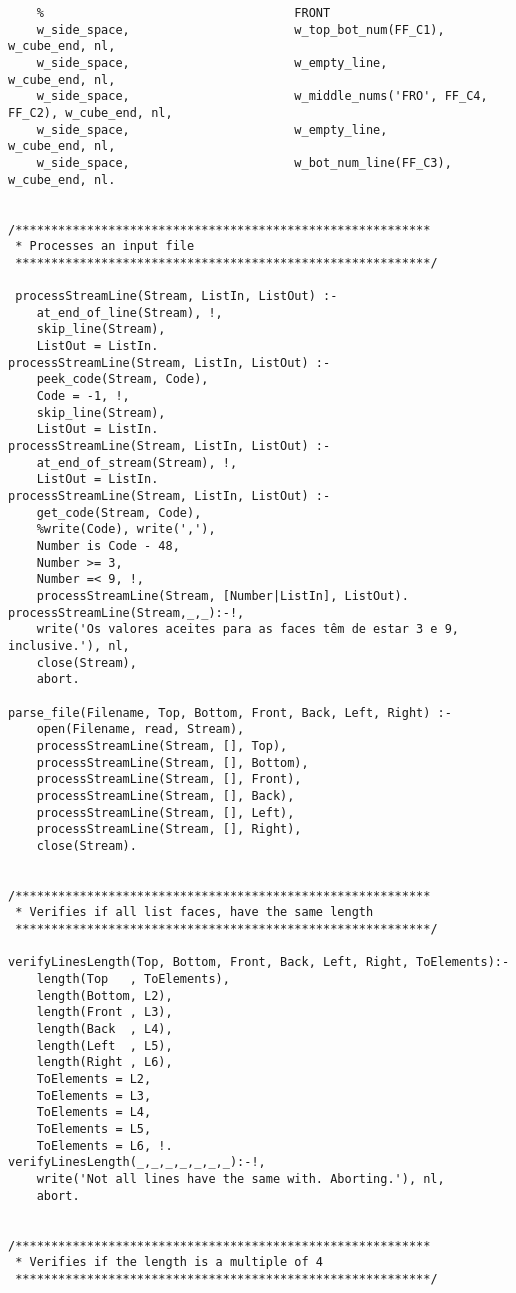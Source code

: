 \begin{lstlisting}
	%                                   FRONT
	w_side_space,                       w_top_bot_num(FF_C1),               w_cube_end, nl,
	w_side_space,                       w_empty_line,                       w_cube_end, nl,
	w_side_space,                       w_middle_nums('FRO', FF_C4, FF_C2), w_cube_end, nl,
	w_side_space,                       w_empty_line,                       w_cube_end, nl,
	w_side_space,                       w_bot_num_line(FF_C3),              w_cube_end, nl.
	

/**********************************************************
 * Processes an input file
 **********************************************************/

 processStreamLine(Stream, ListIn, ListOut) :-
	at_end_of_line(Stream), !,
	skip_line(Stream),
	ListOut = ListIn.
processStreamLine(Stream, ListIn, ListOut) :-
	peek_code(Stream, Code),
	Code = -1, !,
	skip_line(Stream),
	ListOut = ListIn. 
processStreamLine(Stream, ListIn, ListOut) :-
	at_end_of_stream(Stream), !,
	ListOut = ListIn.
processStreamLine(Stream, ListIn, ListOut) :-
	get_code(Stream, Code),
	%write(Code), write(','),
	Number is Code - 48,
	Number >= 3,
	Number =< 9, !,
	processStreamLine(Stream, [Number|ListIn], ListOut).
processStreamLine(Stream,_,_):-!,
	write('Os valores aceites para as faces têm de estar 3 e 9, inclusive.'), nl,
	close(Stream),
	abort.
	
parse_file(Filename, Top, Bottom, Front, Back, Left, Right) :-
	open(Filename, read, Stream),
	processStreamLine(Stream, [], Top),
	processStreamLine(Stream, [], Bottom),
	processStreamLine(Stream, [], Front),
	processStreamLine(Stream, [], Back),
	processStreamLine(Stream, [], Left),
	processStreamLine(Stream, [], Right),
	close(Stream).
	
	
/**********************************************************
 * Verifies if all list faces, have the same length
 **********************************************************/
 
verifyLinesLength(Top, Bottom, Front, Back, Left, Right, ToElements):-
	length(Top   , ToElements),
	length(Bottom, L2),
	length(Front , L3),
	length(Back  , L4),
	length(Left  , L5),
	length(Right , L6),
	ToElements = L2,
	ToElements = L3,
	ToElements = L4,
	ToElements = L5,
	ToElements = L6, !.
verifyLinesLength(_,_,_,_,_,_,_):-!,
	write('Not all lines have the same with. Aborting.'), nl,
	abort.

	
/**********************************************************
 * Verifies if the length is a multiple of 4
 **********************************************************/
 

\end{lstlisting}
